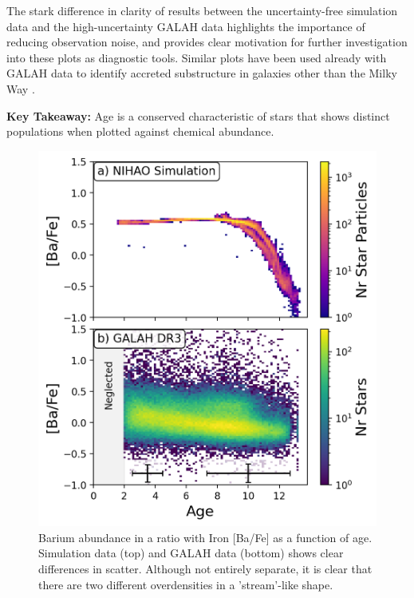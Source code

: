 \documentclass[fleqn,usenatbib]{mnras}
\begin{document}
The stark difference in clarity of results between the uncertainty-free simulation data and the high-uncertainty GALAH data highlights the importance of reducing observation noise, and provides clear motivation for further investigation into these plots as diagnostic tools. Similar plots have been used already with GALAH data to identify accreted substructure in galaxies other than the Milky Way \citep{Martig2021}.\par 
\textbf{Key Takeaway:} Age is a conserved characteristic of stars that shows distinct populations when plotted against chemical abundance.
\begin{figure}
	\includegraphics[width=\columnwidth]{figures/Ba_Fe_time.png}
    \caption{Barium abundance in a ratio with Iron [Ba/Fe] as a function of age. Simulation data (top) and GALAH data (bottom) shows clear differences in scatter. Although not entirely separate, it is clear that there are two different overdensities in a 'stream'-like shape.}
    \label{fig:BaFetime}
\end{figure}
\end{document}
